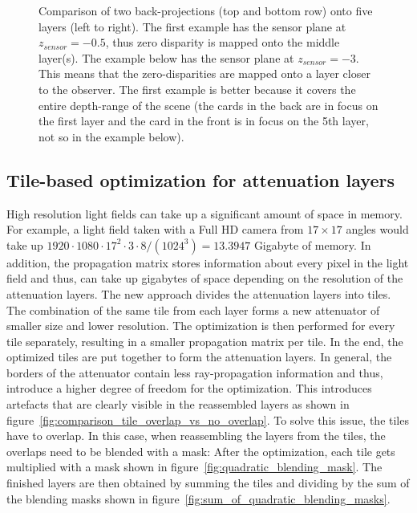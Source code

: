 \documentclass[11pt,a4paper,titlepage]{article}
\begin{document}
\begin{figure}
	\caption{Comparison of two back-projections (top and bottom row) onto five layers (left to right). The first example has the sensor plane at $z_{sensor} = -0.5$, thus zero disparity is mapped onto the middle layer(s). The example below has the sensor plane at $z_{sensor} = -3$. This means that the zero-disparities are mapped onto a layer closer to the observer. The first example is better because it covers the entire depth-range of the scene (the cards in the back are in focus on the first layer and the card in the front is in focus on the 5th layer, not so in the example below).}
	\label{fig:comparison_of_two_backprojections}
\end{figure}

\subsection{Tile-based optimization for attenuation layers}
High resolution light fields can take up a significant amount of space in memory. For example, a light field taken with a Full HD camera from $17\times17$ angles would take up $1920 \cdot 1080 \cdot 17^2 \cdot 3 \cdot 8 / \left(1024^3\right) = 13.3947$ Gigabyte of memory. In addition, the propagation matrix stores information about every pixel in the light field and thus, can take up gigabytes of space depending on the resolution of the attenuation layers. The new approach divides the attenuation layers into tiles. The combination of the same tile from each layer forms a new attenuator of smaller size and lower resolution. The optimization is then performed for every tile separately, resulting in a smaller propagation matrix per tile. In the end, the optimized tiles are put together to form the attenuation layers. In general, the borders of the attenuator contain less ray-propagation information and thus, introduce a higher degree of freedom for the optimization. This introduces artefacts that are clearly visible in the reassembled layers as shown in figure~\ref{fig:comparison_tile_overlap_vs_no_overlap}. To solve this issue, the tiles have to overlap. In this case, when reassembling the layers from the tiles, the overlaps need to be blended with a mask: After the optimization, each tile gets multiplied with a mask shown in figure~\ref{fig:quadratic_blending_mask}. The finished layers are then obtained by summing the tiles and dividing by the sum of the blending masks shown in figure~\ref{fig:sum_of_quadratic_blending_masks}.
\end{document}
